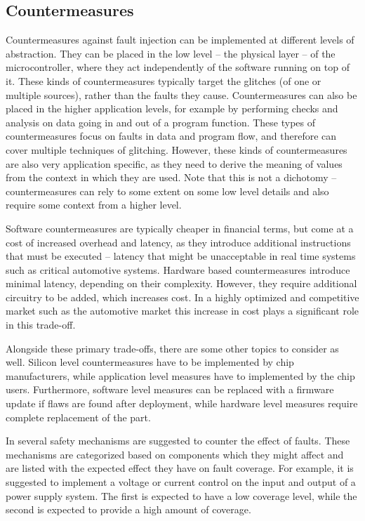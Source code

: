 \documentclass[10pt]{article}
\begin{document}
  \subsection{Countermeasures }
  \label{sec:background-countermeasures}
    Countermeasures against fault injection can be implemented at different levels of abstraction. 
    They can be placed in the low level -- the physical layer -- of the microcontroller, where they act independently of the software running on top of it. 
    These kinds of countermeasures typically target the glitches (of one or multiple sources), rather than the faults they cause. 
    Countermeasures can also be placed in the higher application levels, for example by performing checks and analysis on data going in and out of a program function. These types of countermeasures focus on faults in data and program flow, and therefore can cover multiple techniques of glitching. However, these kinds of countermeasures are also very application specific, as they need to derive the meaning of values from the context in which they are used.  Note that this is not a dichotomy -- countermeasures can rely to some extent on some low level details and also require some context from a higher level.

    Software countermeasures are typically cheaper in financial terms, but come at a cost of increased overhead and latency, as they introduce additional instructions that must be executed --  latency that might be unacceptable in real time systems such as critical automotive systems. Hardware based countermeasures introduce minimal latency, depending on their complexity. However, they require additional circuitry to be added, which increases cost. In a highly optimized and competitive market such as the automotive market this increase in cost plays a significant role in this trade-off. 

    Alongside these primary trade-offs, there are some other topics to consider as well. Silicon level countermeasures have to be implemented by chip manufacturers, while application level measures have to implemented by the chip users. Furthermore, software level measures can be replaced with a firmware update if flaws are found after deployment, while hardware level measures require complete replacement of the part. 

    In \citet[Annex D]{iso26262-5} several safety mechanisms are suggested to counter the effect of faults. These mechanisms are categorized based on components which they might affect and are listed with the expected effect they have on fault coverage. For example, it is suggested to implement a voltage or current control on the input and output of a power supply system. The first is expected to have a low coverage level, while the second is expected to provide a high amount of coverage.
\end{document}

